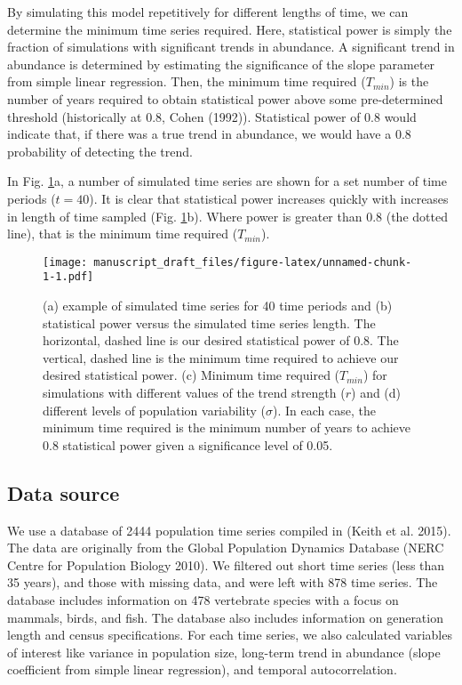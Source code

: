 \documentclass[12pt,]{article}
\begin{document}
By simulating this model repetitively for different lengths of time, we
can determine the minimum time series required. Here, statistical power
is simply the fraction of simulations with significant trends in
abundance. A significant trend in abundance is determined by estimating
the significance of the slope parameter from simple linear regression.
Then, the minimum time required (\(T_{min}\)) is the number of years
required to obtain statistical power above some pre-determined threshold
(historically at 0.8, Cohen (1992)). Statistical power of 0.8 would
indicate that, if there was a true trend in abundance, we would have a
0.8 probability of detecting the trend.

In Fig. \ref{fig:theoretical_approach}a, a number of simulated time
series are shown for a set number of time periods (\(t=40\)). It is
clear that statistical power increases quickly with increases in length
of time sampled (Fig. \ref{fig:theoretical_approach}b). Where power is
greater than 0.8 (the dotted line), that is the minimum time required
(\(T_{min}\)).

\begin{figure}[htbp]
\centering
\texttt{[image: manuscript\_draft\_files/figure-latex/unnamed-chunk-1-1.pdf]}
\caption{(a) example of simulated time series for 40 time periods and
(b) statistical power versus the simulated time series length. The
horizontal, dashed line is our desired statistical power of 0.8. The
vertical, dashed line is the minimum time required to achieve our
desired statistical power. (c) Minimum time required (\(T_{min}\)) for
simulations with different values of the trend strength (\(r\)) and (d)
different levels of population variability (\(\sigma\)). In each case,
the minimum time required is the minimum number of years to achieve 0.8
statistical power given a significance level of
0.05.\label{fig:theoretical_approach}}
\end{figure}

\subsection{Data source}\label{data-source}

We use a database of 2444 population time series compiled in (Keith et
al. 2015). The data are originally from the Global Population Dynamics
Database (NERC Centre for Population Biology 2010). We filtered out
short time series (less than 35 years), and those with missing data, and
were left with 878 time series. The database includes information on 478
vertebrate species with a focus on mammals, birds, and fish. The
database also includes information on generation length and census
specifications. For each time series, we also calculated variables of
interest like variance in population size, long-term trend in abundance
(slope coefficient from simple linear regression), and temporal
autocorrelation.
\end{document}
